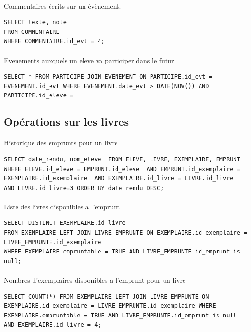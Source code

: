 \documentclass[a4paper, 11pt]{article}
\begin{document}
\paragraph{}
Commentaires écrits sur un évènement.
\begin{verbatim}
SELECT texte, note 
FROM COMMENTAIRE
WHERE COMMENTAIRE.id_evt = 4;
\end{verbatim}
\paragraph{}
Evenements auxquels un eleve va participer dans le futur
\begin{verbatim}
SELECT * FROM PARTICIPE JOIN EVENEMENT ON PARTICIPE.id_evt = EVENEMENT.id_evt WHERE EVENEMENT.date_evt > DATE(NOW()) AND  PARTICIPE.id_eleve = 
\end{verbatim}
\subsection{Opérations sur les livres}
\paragraph{}
Historique des emprunts pour un livre
\begin{verbatim}
SELECT date_rendu, nom_eleve  FROM ELEVE, LIVRE, EXEMPLAIRE, EMPRUNT  WHERE ELEVE.id_eleve = EMPRUNT.id_eleve  AND EMPRUNT.id_exemplaire = EXEMPLAIRE.id_exemplaire  AND EXEMPLAIRE.id_livre = LIVRE.id_livre  AND LIVRE.id_livre=3 ORDER BY date_rendu DESC;
\end{verbatim}
\paragraph{}
Liste des livres disponibles a l'emprunt
\begin{verbatim}
SELECT DISTINCT EXEMPLAIRE.id_livre 
FROM EXEMPLAIRE LEFT JOIN LIVRE_EMPRUNTE ON EXEMPLAIRE.id_exemplaire = LIVRE_EMPRUNTE.id_exemplaire
WHERE EXEMPLAIRE.empruntable = TRUE AND LIVRE_EMPRUNTE.id_emprunt is null;
\end{verbatim}
\paragraph{}
Nombres d'exemplaires disponibles a l'emprunt pour un livre
\begin{verbatim}
SELECT COUNT(*) FROM EXEMPLAIRE LEFT JOIN LIVRE_EMPRUNTE ON EXEMPLAIRE.id_exemplaire = LIVRE_EMPRUNTE.id_exemplaire WHERE EXEMPLAIRE.empruntable = TRUE AND LIVRE_EMPRUNTE.id_emprunt is null AND EXEMPLAIRE.id_livre = 4;
\end{verbatim}
\end{document}
